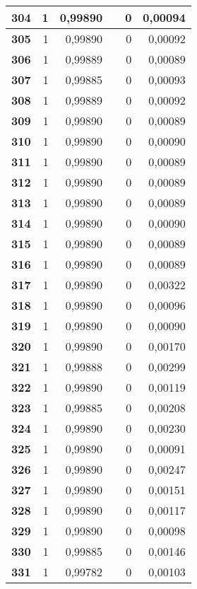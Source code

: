 \begin{longtable}{|r|r|r|l|r|r|}
\textbf{304} & 1 & 0,99890 &  & 0 & 0,00094 \\ \hline
\textbf{305} & 1 & 0,99890 &  & 0 & 0,00092 \\ \hline
\textbf{306} & 1 & 0,99889 &  & 0 & 0,00089 \\ \hline
\textbf{307} & 1 & 0,99885 &  & 0 & 0,00093 \\ \hline
\textbf{308} & 1 & 0,99889 &  & 0 & 0,00092 \\ \hline
\textbf{309} & 1 & 0,99890 &  & 0 & 0,00089 \\ \hline
\textbf{310} & 1 & 0,99890 &  & 0 & 0,00090 \\ \hline
\textbf{311} & 1 & 0,99890 &  & 0 & 0,00089 \\ \hline
\textbf{312} & 1 & 0,99890 &  & 0 & 0,00089 \\ \hline
\textbf{313} & 1 & 0,99890 &  & 0 & 0,00089 \\ \hline
\textbf{314} & 1 & 0,99890 &  & 0 & 0,00090 \\ \hline
\textbf{315} & 1 & 0,99890 &  & 0 & 0,00089 \\ \hline
\textbf{316} & 1 & 0,99890 &  & 0 & 0,00089 \\ \hline
\textbf{317} & 1 & 0,99890 &  & 0 & 0,00322 \\ \hline
\textbf{318} & 1 & 0,99890 &  & 0 & 0,00096 \\ \hline
\textbf{319} & 1 & 0,99890 &  & 0 & 0,00090 \\ \hline
\textbf{320} & 1 & 0,99890 &  & 0 & 0,00170 \\ \hline
\textbf{321} & 1 & 0,99888 &  & 0 & 0,00299 \\ \hline
\textbf{322} & 1 & 0,99890 &  & 0 & 0,00119 \\ \hline
\textbf{323} & 1 & 0,99885 &  & 0 & 0,00208 \\ \hline
\textbf{324} & 1 & 0,99890 &  & 0 & 0,00230 \\ \hline
\textbf{325} & 1 & 0,99890 &  & 0 & 0,00091 \\ \hline
\textbf{326} & 1 & 0,99890 &  & 0 & 0,00247 \\ \hline
\textbf{327} & 1 & 0,99890 &  & 0 & 0,00151 \\ \hline
\textbf{328} & 1 & 0,99890 &  & 0 & 0,00117 \\ \hline
\textbf{329} & 1 & 0,99890 &  & 0 & 0,00098 \\ \hline
\textbf{330} & 1 & 0,99885 &  & 0 & 0,00146 \\ \hline
\textbf{331} & 1 & 0,99782 &  & 0 & 0,00103 \\ \hline

\end{longtable}
